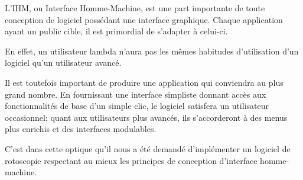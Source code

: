 
\vspace{0,5cm}

L'\textsc{IHM}, ou Interface Homme-Machine, est une part importante de toute conception de logiciel possédant une interface graphique. Chaque application ayant un public cible, il est primordial de s'adapter à celui-ci. 

En effet, un utilisateur lambda n'aura pas les mêmes habitudes d'utilisation d'un logiciel qu'un utilisateur avancé.

\vspace{1cm}

Il est toutefois important de produire une application qui conviendra au plus grand nombre. En fournissant une interface simpliste donnant accès aux fonctionnalités de base d'un simple clic, le logiciel satisfera un utilisateur occasionnel; quant aux utilisateurs plus avancés, ils s'accorderont à des menus plus enrichis et des interfaces modulables.


\vspace{1cm}

C'est dans cette optique qu'il nous a été demandé d'implémenter un logiciel de rotoscopie respectant au mieux les principes de conception d'interface homme-machine.